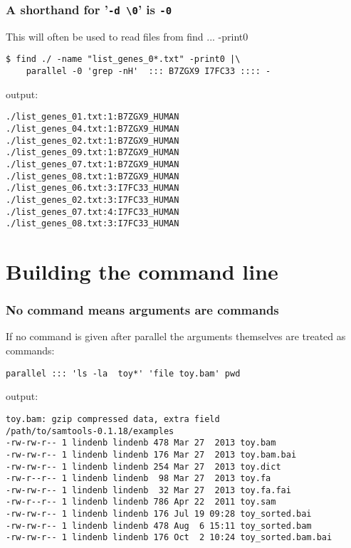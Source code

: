 \documentclass{article}
\begin{document}
\subsubsection{A shorthand for '\texttt{-d  \textbackslash{}0}' is \texttt{-0}}
This will often be used to read files from find ... -print0
\begin{lstlisting}
$ find ./ -name "list_genes_0*.txt" -print0 |\
	parallel -0 'grep -nH'  ::: B7ZGX9 I7FC33 :::: -
\end{lstlisting}
output:
\begin{lstlisting}
./list_genes_01.txt:1:B7ZGX9_HUMAN
./list_genes_04.txt:1:B7ZGX9_HUMAN
./list_genes_02.txt:1:B7ZGX9_HUMAN
./list_genes_09.txt:1:B7ZGX9_HUMAN
./list_genes_07.txt:1:B7ZGX9_HUMAN
./list_genes_08.txt:1:B7ZGX9_HUMAN
./list_genes_06.txt:3:I7FC33_HUMAN
./list_genes_02.txt:3:I7FC33_HUMAN
./list_genes_07.txt:4:I7FC33_HUMAN
./list_genes_08.txt:3:I7FC33_HUMAN
\end{lstlisting}


\section{Building the command line}

\subsubsection{No command means arguments are commands}

If no command is given after parallel the arguments themselves are treated as commands:
\begin{lstlisting}
parallel ::: 'ls -la  toy*' 'file toy.bam' pwd
\end{lstlisting}
output:
\begin{lstlisting}
toy.bam: gzip compressed data, extra field
/path/to/samtools-0.1.18/examples
-rw-rw-r-- 1 lindenb lindenb 478 Mar 27  2013 toy.bam
-rw-rw-r-- 1 lindenb lindenb 176 Mar 27  2013 toy.bam.bai
-rw-rw-r-- 1 lindenb lindenb 254 Mar 27  2013 toy.dict
-rw-r--r-- 1 lindenb lindenb  98 Mar 27  2013 toy.fa
-rw-rw-r-- 1 lindenb lindenb  32 Mar 27  2013 toy.fa.fai
-rw-r--r-- 1 lindenb lindenb 786 Apr 22  2011 toy.sam
-rw-rw-r-- 1 lindenb lindenb 176 Jul 19 09:28 toy_sorted.bai
-rw-rw-r-- 1 lindenb lindenb 478 Aug  6 15:11 toy_sorted.bam
-rw-rw-r-- 1 lindenb lindenb 176 Oct  2 10:24 toy_sorted.bam.bai
\end{lstlisting}
\end{document}
